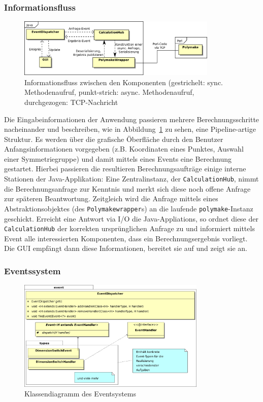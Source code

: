     \subsubsection{Informationsfluss\label{ssec:flow}}
        \begin{figure}[tbh]
            \centering
            \includegraphics[width=0.85\textwidth]{img/flow}
            \caption{Informationsfluss zwischen den Komponenten
                      {\scriptsize(gestrichelt: sync. Methodenaufruf, punkt-strich: async. Methodenaufruf, durchgezogen: TCP-Nachricht}\label{fig:flow}}
        \end{figure}

        \noindent Die Eingabeinformationen der Anwendung passieren mehrere Berechnungsschritte nacheinander und beschreiben, wie in Abbildung~\ref{fig:flow} zu sehen, eine Pipeline-artige Struktur.
        Es werden über die grafische Öberfläche durch den Benutzer Anfangsinformationen vorgegeben (z.B. Koordinaten eines Punktes, Auswahl einer Symmetriegruppe)
        und damit mittels eines Events eine Berechnung gestartet. Hierbei passieren die resultieren Berechnungsaufträge einige interne Stationen der Java-Applikation:
        Eine Zentralinstanz, der \texttt{CalculationHub}, nimmt die Berechnungsanfrage zur Kenntnis und merkt sich diese noch offene Anfrage zur späteren Beantwortung.
        Zeitgleich wird die Anfrage mittels eines Abstraktionsobjektes (des \texttt{Polymakewrapper}s) an die laufende \texttt{polymake}-Instanz geschickt.
        Erreicht eine Antwort via I/O die Java-Appliations, so ordnet diese der \texttt{CalculationHub} der korrekten ursprünglichen Anfrage zu und informiert mittels Event alle
        interessierten Komponenten, dass ein Berechnungsergebnis vorliegt.
        Die GUI empfängt dann diese Informationen, bereitet sie auf und zeigt sie an.

    \subsubsection{Eventssystem\label{ssec:event}}
        \begin{figure}[bht]
            \centering
            \includegraphics[width=0.8\textwidth]{img/event_classdiagram2}
            \caption{Klassendiagramm des Eventsystems}
        \end{figure}

